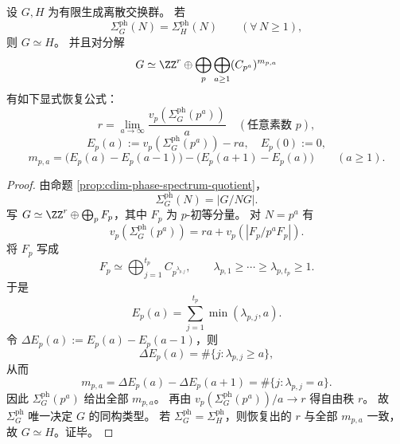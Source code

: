 \begin{theorem}[循环相位采样计数的同构完全性]\label{thm:cdim-phase-spectrum-reconstruction}
设 \(G,H\) 为有限生成离散交换群。
若
\[
\Sigma_G^{\mathrm{ph}}(N)=\Sigma_H^{\mathrm{ph}}(N)\qquad(\forall\,N\ge 1),
\]
则 \(G\simeq H\)。
并且对分解
\[
G\simeq \ZZ^r\oplus\bigoplus_{p}\bigoplus_{a\ge 1}(C_{p^a})^{m_{p,a}}
\]
有如下显式恢复公式：
\[
r=\lim_{a\to\infty}\frac{v_p(\Sigma_G^{\mathrm{ph}}(p^a))}{a}\quad(\text{任意素数 }p),
\]
\[
E_p(a):=v_p(\Sigma_G^{\mathrm{ph}}(p^a))-ra,\quad E_p(0):=0,
\]
\[
m_{p,a}
=\bigl(E_p(a)-E_p(a-1)\bigr)-\bigl(E_p(a+1)-E_p(a)\bigr)\qquad(a\ge 1).
\]
\end{theorem}
\begin{proof}
由命题 \ref{prop:cdim-phase-spectrum-quotient}，
\[
\Sigma_G^{\mathrm{ph}}(N)=|G/NG|.
\]
写 \(G\simeq \ZZ^r\oplus\bigoplus_p F_p\)，其中 \(F_p\) 为 \(p\)-初等分量。
对 \(N=p^a\) 有
\[
v_p(\Sigma_G^{\mathrm{ph}}(p^a))
=ra+v_p(|F_p/p^aF_p|).
\]
将 \(F_p\) 写成
\[
F_p\simeq\bigoplus_{j=1}^{t_p}C_{p^{\lambda_{p,j}}},\qquad
\lambda_{p,1}\ge\cdots\ge\lambda_{p,t_p}\ge 1.
\]
于是
\[
E_p(a)=\sum_{j=1}^{t_p}\min(\lambda_{p,j},a).
\]
令 \(\Delta E_p(a):=E_p(a)-E_p(a-1)\)，则
\[
\Delta E_p(a)=\#\{j:\lambda_{p,j}\ge a\},
\]
从而
\[
m_{p,a}
=\Delta E_p(a)-\Delta E_p(a+1)
=\#\{j:\lambda_{p,j}=a\}.
\]
因此 \(\Sigma_G^{\mathrm{ph}}(p^a)\) 给出全部 \(m_{p,a}\)。
再由 \(v_p(\Sigma_G^{\mathrm{ph}}(p^a))/a\to r\) 得自由秩 \(r\)。
故 \(\Sigma_G^{\mathrm{ph}}\) 唯一决定 \(G\) 的同构类型。
若 \(\Sigma_G^{\mathrm{ph}}=\Sigma_H^{\mathrm{ph}}\)，则恢复出的 \(r\) 与全部 \(m_{p,a}\) 一致，故 \(G\simeq H\)。证毕。
\end{proof}

